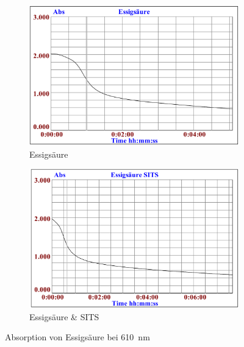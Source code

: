 \documentclass[a4paper,german]{scrreprt}
\begin{document}
\begin{figure}
	\centering
	\begin{subfigure}{.5\textwidth}
		\centering
		\includegraphics[width=\linewidth]{img/haem_essig.png}
		\caption{Essigsäure}
	\end{subfigure}%
	\begin{subfigure}{.5\textwidth}
		\centering
		\includegraphics[width=\linewidth]{img/haem_essig_sits.png}
		\caption{Essigsäure \& SITS}
	\end{subfigure}
	\caption{Absorption von Essigsäure bei \SI{610}{nm}}
	\label{fig:haem_essig}
\end{figure}
\end{document}
